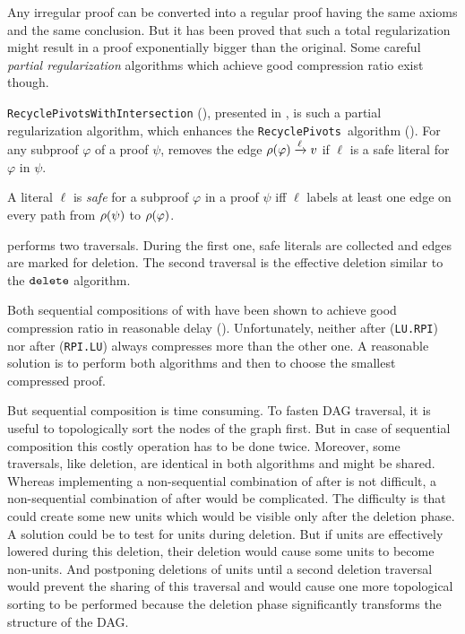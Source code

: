 \documentclass{llncs}
\begin{document}
Any irregular proof can be converted into a regular proof having the same axioms and the same
conclusion. But it has been proved \cite{Tseitin} that such a total regularization might result in a
proof exponentially bigger than the original. Some careful \emph{partial regularization} algorithms
which achieve good compression ratio exist though.

\texttt{RecyclePivotsWithIntersection} ({\RPI}), presented in \cite{LURPI}, is such a partial
regularization algorithm, which enhances the \texttt{RecyclePivots}~algorithm (\cite{RP08}).  For
any subproof $\varphi$ of a proof $\psi$, {\RPI} removes the edge $\rho(\varphi) \xrightarrow{\ell}
v$ if $\ell$ is a safe literal for $\varphi$ in $\psi$.

\begin{definition}
A literal $\ell$ is \emph{safe} for a subproof $\varphi$ in a proof $\psi$ iff $\ell$ labels at
least one edge on every path from $\rho(\psi)$ to $\rho(\varphi)$.
\end{definition}

{\RPI} performs two traversals. During the first one, safe literals are collected and edges are
marked for deletion. The second traversal is the effective deletion similar to the
$\FuncSty{delete}$ algorithm.

Both sequential compositions of {\LowerUnits} with {\RPI} have been shown to achieve good
compression ratio in reasonable delay (\cite{LURPI}). Unfortunately, neither {\LowerUnits} after
{\RPI} (\texttt{LU.RPI}) nor {\RPI} after {\LowerUnits} (\texttt{RPI.LU}) always compresses more than
the other one. A reasonable solution is to perform both algorithms and then to choose the smallest
compressed proof.

But sequential composition is time consuming. To fasten DAG traversal, it is useful to topologically
sort the nodes of the graph first. But in case of sequential composition this costly operation has to
be done twice. Moreover, some traversals, like deletion, are identical in both algorithms and might
be shared. Whereas implementing a non-sequential combination of {\RPI} after {\LowerUnits} is not
difficult, a non-sequential combination of {\LowerUnits} after {\RPI} would be complicated. The
difficulty is that {\RPI} could create some new units which would be visible only after the deletion phase.  A solution could be to test for units during deletion. But if units are
effectively lowered during this deletion, their deletion would cause some units to become non-units.
And postponing deletions of units until a second deletion traversal would prevent the sharing of
this traversal and would cause one more topological sorting to be performed because the deletion phase
significantly transforms the structure of the DAG.
\end{document}
